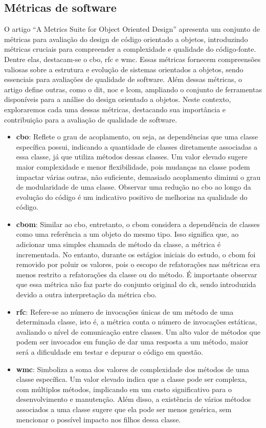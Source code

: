 {\subsection{Métricas de software}
O artigo ``A Metrics Suite for Object Oriented Design'' \cite{MetricsSuite} apresenta um conjunto de métricas para avaliação do design de código orientado a objetos, introduzindo métricas cruciais para compreender a complexidade e qualidade do código-fonte. Dentre elas, destacam-se o \gls{cbo}, \gls{rfc} e \gls{wmc}. Essas métricas fornecem compreensões valiosas sobre a estrutura e evolução de sistemas orientados a objetos, sendo essenciais para avaliações de qualidade de software. Além dessas métricas, o artigo define outras, como o \gls{dit}, \gls{noc} e \gls{lcom}, ampliando o conjunto de ferramentas disponíveis para a análise do design orientado a objetos. Neste contexto, exploraremos cada uma dessas métricas, destacando sua importância e contribuição para a avaliação de qualidade de software.

\begin{itemize}
    \item \textbf{\gls{cbo}}: Reflete o grau de acoplamento, ou seja, as dependências que uma classe específica possui, indicando a quantidade de classes diretamente associadas a essa classe, já que utiliza métodos dessas classes. Um valor elevado sugere maior complexidade e menor flexibilidade, pois mudanças na classe podem impactar várias outras, não suficiente, demasiado acoplamento diminui o grau de modularidade de uma classe. Observar uma redução no \gls{cbo} ao longo da evolução do código é um indicativo positivo de melhorias na qualidade do código.
    \item \textbf{\gls{cbom}}: Similar ao \gls{cbo}, entretanto, o \gls{cbom} considera a dependência de classes como uma referência a um objeto do mesmo tipo. Isso significa que, ao adicionar uma simples chamada de método da classe, a métrica é incrementada. No entanto, durante os estágios iniciais do estudo, o \gls{cbom} foi removido por poluir os valores, pois o escopo de refatorações nas métricas era menos restrito a refatorações da classe ou do método. É importante observar que essa métrica não faz parte do conjunto original do \gls{ck}, sendo introduzida devido a outra interpretação da métrica \gls{cbo}.
    \item \textbf{\gls{rfc}}: Refere-se ao número de invocações únicas de um método de uma determinada classe, isto é, a métrica conta o número de invocações estáticas, avaliando o nível de comunicação entre classes. Um alto valor de métodos que podem ser invocados em função de dar uma resposta a um método, maior será a dificuldade em testar e depurar o código em questão.
    \item \textbf{\gls{wmc}}: Simboliza a soma dos valores de complexidade dos métodos de uma classe específica. Um valor elevado indica que a classe pode ser complexa, com múltiplos métodos, implicando em um custo significativo para o desenvolvimento e manutenção. Além disso, a existência de vários métodos associados a uma classe sugere que ela pode ser menos genérica, sem mencionar o possível impacto nos filhos dessa classe.
\end{itemize}
}
